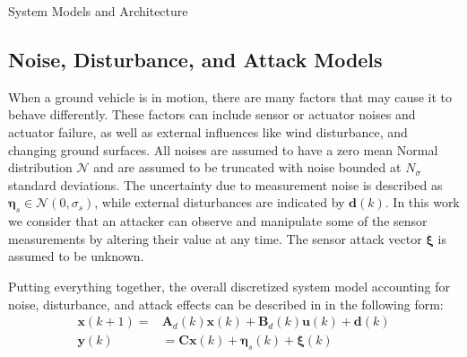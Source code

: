 \begin{section}{System Models and Architecture}
 \subsection{Noise, Disturbance, and Attack Models}
When a ground vehicle is in motion, there are many factors that may cause it to behave differently. These factors can include sensor or actuator noises and actuator failure, as well as external influences like wind disturbance, and changing ground surfaces. All noises are assumed to have a zero mean Normal distribution $\mathcal{N}$ and are assumed to be truncated with noise bounded at $N_{\sigma}$ standard deviations. The uncertainty due to measurement noise is described as $\bm{\eta}_s \in \mathcal{N}(0,\sigma_s)$, while external disturbances are indicated by $\bm{d}(k)$. In this work we consider that an attacker can observe and manipulate some of the sensor measurements by altering their value at any time. The sensor attack vector $\bm{\xi}$ is assumed to be unknown. 

Putting everything together, the overall discretized system model accounting for noise, disturbance, and attack effects can be described in in the following form:
    \begin{equation}
    \begin{split}
    \label{eq:discrete_SS}
	\bm{x}(k+1)=&\bm{A}_d(k)\bm{x}(k)+\bm{B}_d(k)\bm{u}(k)+\bm{d}(k) \\
	\bm{y}(k)&=\bm{C}\bm{x}(k)+\bm{\eta}_s(k)+\bm{\xi}(k)
	\end{split}
	\end{equation}




\end{section}
